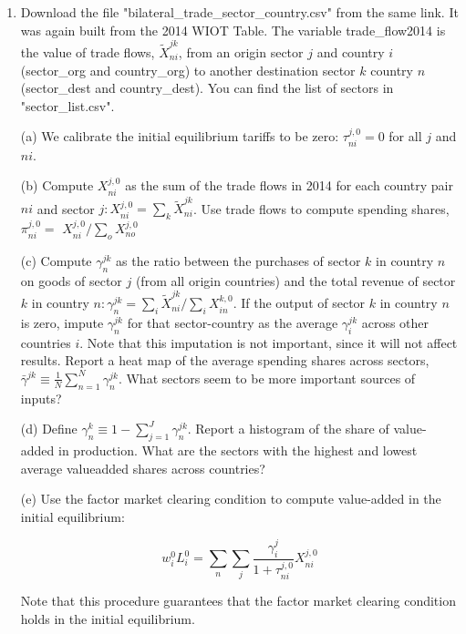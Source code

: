 \documentclass[12pt,oneside,reqno]{article}
\begin{document}
\begin{enumerate}[label=\roman*., leftmargin=*]
\begin{enumerate}
\end{enumerate}

\item Download the file "bilateral\_trade\_sector\_country.csv" from the same link. It was again built from the 2014 WIOT Table. The variable trade\_flow2014 is the value of trade flows, $\tilde{X}_{n i}^{j k}$, from an origin sector $j$ and country $i$ (sector\_org and country\_org) to another destination sector $k$ country $n$ (sector\_dest and country\_dest). You can find the list of sectors in "sector\_list.csv".

(a) We calibrate the initial equilibrium tariffs to be zero: $\tau_{n i}^{j, 0}=0$ for all $j$ and $n i$.

(b) Compute $X_{n i}^{j, 0}$ as the sum of the trade flows in 2014 for each country pair $n i$ and sector $j: X_{n i}^{j, 0}=\sum_{k} \tilde{X}_{n i}^{j k}$. Use trade flows to compute spending shares, $\pi_{n i}^{j, 0}=$ $X_{n i}^{j, 0} / \sum_{o} X_{n o}^{j, 0}$

(c) Compute $\gamma_{n}^{j k}$ as the ratio between the purchases of sector $k$ in country $n$ on goods of sector $j$ (from all origin countries) and the total revenue of sector $k$ in country $n: \gamma_{n}^{j k}=\sum_{i} \tilde{X}_{n i}^{j k} / \sum_{i} X_{i n}^{k, 0}$. If the output of sector $k$ in country $n$ is zero, impute $\gamma_{n}^{j k}$ for that sector-country as the average $\gamma_{i}^{j k}$ across other countries $i$. Note that this imputation is not important, since it will not affect results. Report a heat map of the average spending shares across sectors, $\bar{\gamma}^{j k} \equiv \frac{1}{N} \sum_{n=1}^{N} \gamma_{n}^{j k}$. What sectors seem to be more important sources of inputs?

(d) Define $\gamma_{n}^{k} \equiv 1-\sum_{j=1}^{J} \gamma_{n}^{j k}$. Report a histogram of the share of value-added in production. What are the sectors with the highest and lowest average valueadded shares across countries?

(e) Use the factor market clearing condition to compute value-added in the initial equilibrium:

\begin{equation*}
w_{i}^{0} L_{i}^{0}=\sum_{n} \sum_{j} \frac{\gamma_{i}^{j}}{1+\tau_{n i}^{j, 0}} X_{n i}^{j, 0}
\end{equation*}

Note that this procedure guarantees that the factor market clearing condition holds in the initial equilibrium.


\end{enumerate}
\end{document}
